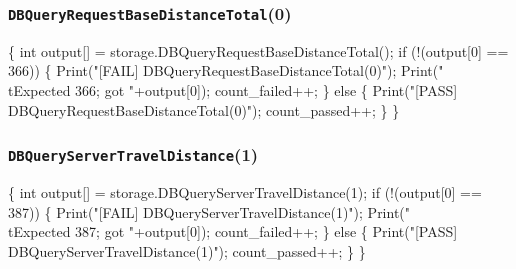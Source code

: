 \documentclass{article}
\def\nwendcode{\endtrivlist \endgroup}
\let\nwdocspar=\par
\begin{document}
\subsubsection{{\tt{}DBQueryRequestBaseDistanceTotal}(0)}
\nwenddocs{}\endmoddef{}
\{
  int output[] = storage.DBQueryRequestBaseDistanceTotal();
  if (!(output[0] == 366)) \{
    Print("[FAIL] DBQueryRequestBaseDistanceTotal(0)");
    Print("\\tExpected 366; got "+output[0]);
    count_failed++;
  \} else \{
    Print("[PASS] DBQueryRequestBaseDistanceTotal(0)");
    count_passed++;
  \}
\}
\nwendcode{}\nwdocspar
\subsubsection{{\tt{}DBQueryServerTravelDistance}(1)}
\nwenddocs{}\endmoddef{}
\{
  int output[] = storage.DBQueryServerTravelDistance(1);
  if (!(output[0] == 387)) \{
    Print("[FAIL] DBQueryServerTravelDistance(1)");
    Print("\\tExpected 387; got "+output[0]);
    count_failed++;
  \} else \{
    Print("[PASS] DBQueryServerTravelDistance(1)");
    count_passed++;
  \}
\}
\nwendcode{}\nwdocspar
\end{document}
